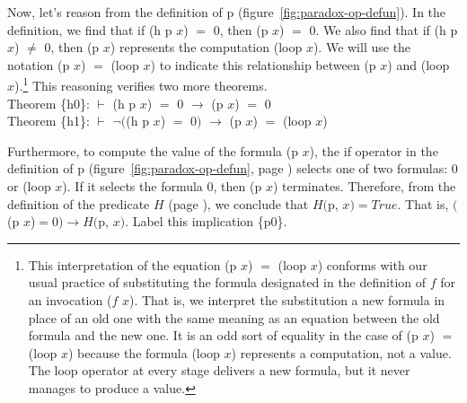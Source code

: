Now, let's reason from the definition of
\textsf{p} (figure~\ref{fig:paradox-op-defun}).
In the definition, we find that if \textsf{(h p $x$)} $=$ \textsf{0},
then \textsf{(p $x$)} $=$ \textsf{0}.
We also find that if \textsf{(h p $x$)} $\neq$ \textsf{0},
then \textsf{(p $x$)} represents
the computation \textsf{(loop $x$)}.
We will use the notation \textsf{(p $x$)} $=$ \textsf{(loop $x$)}
to indicate this relationship between \textsf{(p $x$)} and \textsf{(loop $x$)}.\footnote{This
\label{caveat:equality-for-loop}
interpretation of the equation \textsf{(p $x$)} $=$ \textsf{(loop $x$)} conforms with
our usual practice of substituting the formula designated in the
definition of $f$ for an invocation \textsf{($f$ $x$)}.
That is, we interpret the substitution a new formula
in place of an old one with the same meaning as an equation
between the old formula and the new one.
It is an odd sort of equality in the case of \textsf{(p $x$)} $=$ \textsf{(loop $x$)}
because the formula \textsf{(loop $x$)} represents a computation,
not a value.
The \textsf{loop} operator at every stage delivers a new formula,
but it never manages to produce a value.}
This reasoning verifies two more theorems.
\vspace{2mm}\\
\hspace*{5mm}Theorem \{h0\}: $\vdash$  \textsf{(h p $x$)} $=$ \textsf{0}  $\rightarrow$ \textsf{(p $x$)} $=$ \textsf{0}    \\
\hspace*{5mm}Theorem \{h1\}: $\vdash$  $\neg($\textsf{(h p $x$)} $=$ \textsf{0}$)$ $\rightarrow$ \textsf{(p $x$)} $=$ \textsf{(loop $x$)}
\vspace{2mm}

Furthermore, to compute the value of the formula \textsf{(p $x$)},
the \textsf{if} operator in the definition of \textsf{p}
(figure~\ref{fig:paradox-op-defun}, page \pageref{fig:paradox-op-defun})
selects one of two formulas:
\textsf{0} or \textsf{(loop $x$)}.
If it selects the formula \textsf{0}, then \textsf{(p $x$)} terminates.
Therefore, from the definition of the predicate $H$ (page \pageref{def:predicate-H}),
we conclude that $H($p, $x)=True$.
That is, $($\textsf{(p $x$)}$=$\textsf{0}$)\rightarrow H($\textsf{p}, $x)$.
Label this implication \{p0\}.

